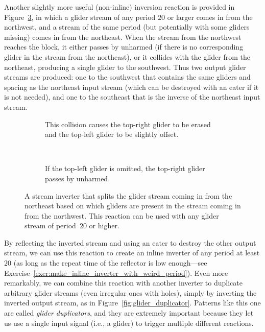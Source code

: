 Another slightly more useful (non-inline) inversion reaction is provided in Figure~\ref{fig:stream_inverter}, in which a glider stream of any period $20$ or larger comes in from the northwest, and a stream of the same period (but potentially with some gliders missing) comes in from the northeast. When the stream from the northwest reaches the block, it either passes by unharmed (if there is no corresponding glider in the stream from the northeast), or it collides with the glider from the northeast, producing a single glider to the southwest. Thus two output glider streams are produced: one to the southwest that contains the same gliders and spacing as the northeast input stream (which can be destroyed with an eater if it is not needed), and one to the southeast that is the inverse of the northeast input stream.

\begin{figure}[!htb]
	\centering
	\begin{subfigure}{.48\textwidth}
		\centering
		\caption{This collision causes the top-right glider to be erased and the top-left glider to be slightly offset.}
		\label{fig:stream_inverter_yes}
	\end{subfigure} \ \ \ \ %
	\begin{subfigure}{.48\textwidth}
		\centering
		\caption{If the top-left glider is omitted, the top-right glider passes by unharmed.}
		\label{fig:stream_inverter_no}
	\end{subfigure}
	\caption{A stream inverter that splits the glider stream coming in from the northeast based on which gliders are present in the stream coming in from the northwest. This reaction can be used with any glider stream of period~$20$ or higher.}\label{fig:stream_inverter}
\end{figure}

By reflecting the inverted stream and using an eater to destroy the other output stream, we can use this reaction to create an inline inverter of any period at least $20$ (as long as the repeat time of the reflector is low enough---see Exercise~\ref{exer:make_inline_inverter_with_weird_period}). Even more remarkably, we can combine this reaction with another inverter to duplicate arbitrary glider streams (even irregular ones with holes), simply by inverting the inverted output stream, as in Figure~\ref{fig:glider_duplicator}. Patterns like this one are called \emph{glider duplicators}, and they are extremely important because they let us use a single input signal (i.e., a glider) to trigger multiple different reactions.

